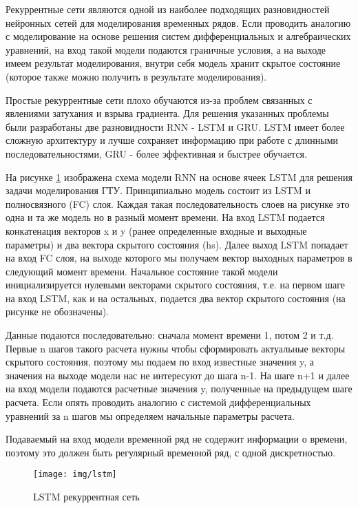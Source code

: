 \documentclass[12pt,a4paper]{article}
\begin{document}
Рекуррентные сети являются одной из наиболее подходящих разновидностей нейронных сетей для моделирования временных рядов. Если проводить аналогию с моделирование на основе решения систем дифференциальных и алгебраических уравнений, на вход такой модели подаются граничные условия, а на выходе имеем результат моделирования, внутри себя модель хранит скрытое состояние (которое также можно получить в результате моделирования). 

Простые рекуррентные сети плохо обучаются из-за проблем связанных с явлениями затухания и взрыва градиента. Для решения указанных проблемы были разработаны две разновидности RNN - LSTM и GRU. LSTM имеет более сложную архитектуру и лучше сохраняет информацию при работе с длинными последовательностями, GRU - более эффективная и быстрее обучается.\cite{habr_lstm_gru}

На рисунке \ref{fig:lstm} изображена схема модели RNN на основе ячеек LSTM для решения задачи моделирования ГТУ. Принципиально модель состоит из LSTM и полносвязного (FC) слоя. Каждая такая последовательность слоев на рисунке это одна и та же модель но в разный момент времени. На вход LSTM подается конкатенация векторов x и y (ранее определенные входные и выходные параметры) и два вектора скрытого состояния (hs). Далее выход LSTM попадает на вход FC слоя, на выходе которого мы получаем вектор выходных параметров в следующий момент времени. Начальное состояние такой модели инициализируется нулевыми векторами скрытого состояния, т.е. на первом шаге на вход LSTM, как и на остальных, подается два вектор скрытого состояния (на рисунке не обозначены).

Данные подаются последовательно: сначала момент времени 1, потом 2 и т.д. Первые n шагов такого расчета нужны чтобы сформировать актуальные векторы скрытого состояния, поэтому мы подаем по вход известные значения y, а значения на выходе модели нас не интересуют до шага n-1. На шаге n+1 и далее на вход модели подаются расчетные значения y, полученные на предыдущем шаге расчета. Если опять проводить аналогию с системой дифференциальных уравнений за n шагов мы определяем начальные параметры расчета.

Подаваемый на вход модели временной ряд не содержит информации о времени, поэтому это должен быть регулярный временной ряд, с одной дискретностью.

\begin{figure}[htb]
	\centering\texttt{[image: img/lstm]}
	\caption{LSTM рекуррентная сеть}
	\label{fig:lstm}
\end{figure}
\end{document}

